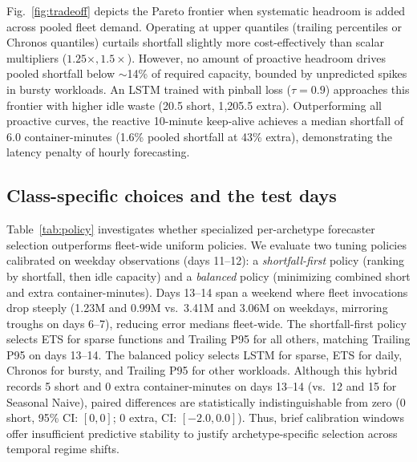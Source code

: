 \documentclass[conference,a4paper]{IEEEtran}
\begin{document}
Fig.~\ref{fig:tradeoff} depicts the Pareto frontier when systematic headroom is added across pooled fleet demand. Operating at upper quantiles (trailing percentiles or Chronos quantiles) curtails shortfall slightly more cost-effectively than scalar multipliers ($1.25\times, 1.5\times$). However, no amount of proactive headroom drives pooled shortfall below $\sim$14\% of required capacity, bounded by unpredicted spikes in bursty workloads. An LSTM trained with pinball loss ($\tau=0.9$) approaches this frontier with higher idle waste (20.5 short, 1{,}205.5 extra). Outperforming all proactive curves, the reactive 10-minute keep-alive achieves a median shortfall of 6.0 container-minutes (1.6\% pooled shortfall at 43\% extra), demonstrating the latency penalty of hourly forecasting.

\subsection{Class-specific choices and the test days}
Table~\ref{tab:policy} investigates whether specialized per-archetype forecaster selection outperforms fleet-wide uniform policies. We evaluate two tuning policies calibrated on weekday observations (days 11--12): a \textit{shortfall-first} policy (ranking by shortfall, then idle capacity) and a \textit{balanced} policy (minimizing combined short and extra container-minutes). Days 13--14 span a weekend where fleet invocations drop steeply (1.23M and 0.99M vs.\ 3.41M and 3.06M on weekdays, mirroring troughs on days 6--7), reducing error medians fleet-wide. The shortfall-first policy selects ETS for sparse functions and Trailing P95 for all others, matching Trailing P95 on days 13--14. The balanced policy selects LSTM for sparse, ETS for daily, Chronos for bursty, and Trailing P95 for other workloads. Although this hybrid records 5 short and 0 extra container-minutes on days 13--14 (vs.\ 12 and 15 for Seasonal Naive), paired differences are statistically indistinguishable from zero (0 short, 95\% CI: $[0, 0]$; 0 extra, CI: $[-2.0, 0.0]$). Thus, brief calibration windows offer insufficient predictive stability to justify archetype-specific selection across temporal regime shifts.
\end{document}
